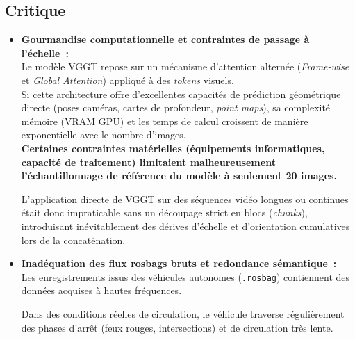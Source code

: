 \documentclass[12pt,a4paper,oneside]{report}
\begin{document}
\subsection{Critique}
\vspace{0.5cm}
\begin{itemize}
    \setlength{\itemsep}{1.5em}
    \renewcommand{\labelitemi}{{\large\bfseries\textbullet}}
    \item {\bfseries Gourmandise computationnelle et contraintes de passage à l'échelle~: \vspace{0.3cm}} \\ 
    \hspace*{1em}Le modèle VGGT repose sur un mécanisme d'attention alternée (\textit{Frame-wise} et \textit{Global Attention}) appliqué à des \textit{tokens} visuels.\\
    \hspace*{.8cm} Si cette architecture offre d'excellentes capacités de prédiction géométrique directe (poses caméras, cartes de profondeur, \textit{point maps}), sa complexité mémoire (VRAM GPU) et les temps de calcul croissent de manière exponentielle avec le nombre d'images. \\

    \hspace*{1em}\textbf{Certaines contraintes matérielles (équipements informatiques, capacité de traitement) limitaient malheureusement l'échantillonnage de référence du modèle à seulement 20 images.} \\

\newpage
\vspace{4cm}

    \hspace*{1em}L'application directe de VGGT sur des séquences vidéo longues ou continues était donc impraticable sans un découpage strict en blocs (\textit{chunks}), introduisant inévitablement des dérives d'échelle et d'orientation cumulatives lors de la concaténation.
    
    \item {\bfseries Inadéquation des flux rosbags bruts et redondance sémantique~:  \vspace{0.3cm}}\\
    \hspace*{1em}Les enregistrements issus des véhicules autonomes (\texttt{.rosbag}) contiennent des données acquises à hautes fréquences. \vspace{0.05cm}

    \hspace*{.8cm}Dans des conditions réelles de circulation, le véhicule traverse régulièrement des phases d'arrêt (feux rouges, intersections) et de circulation très lente.\vspace{0.05cm}


\end{itemize}
\end{document}
